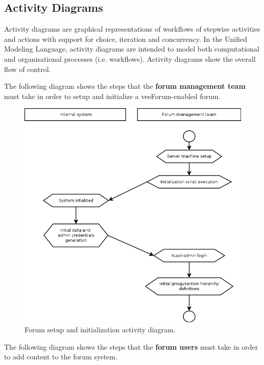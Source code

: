 \documentclass[12pt]{report}
\renewcommand\emph{\textbf}
\begin{document}
                \subsection{Activity Diagrams}
                    Activity diagrams are graphical representations of workflows of stepwise activities and actions with support for choice, iteration and concurrency. 
                    In the Unified Modeling Language, activity diagrams are intended to model both computational and organisational processes (i.e. workflows). 
                    Activity diagrams show the overall flow of control.

                    \newpage

                    The following diagram shows the steps that the \emph{forum management team} must take in order to setup and initialize a veeForum-enabled forum.

                    \begin{figure}[!htb]
                    \caption{Forum setup and initialization activity diagram.}
                    \centering
                    \includegraphics[width=1\textwidth]{uc/a1}
                    \end{figure}

                    \newpage

                    The following diagram shows the steps that the \emph{forum users} must take in order to add content to the forum system.
\end{document}
